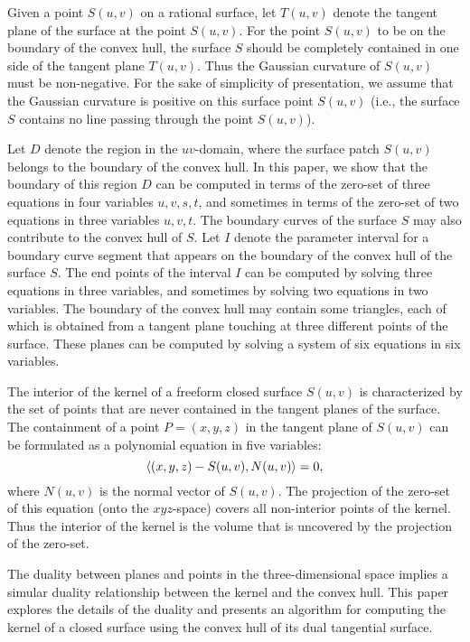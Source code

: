 \documentclass[doublespacing]{elsart}
\begin{document}
Given a point $S(u,v)$ on a rational surface, let $T(u,v)$ denote
the tangent plane of the surface at the point $S(u,v)$.
For the point $S(u,v)$ to be on the boundary of the convex hull,
the surface $S$ should be completely contained in one side of
the tangent plane $T(u,v)$.  Thus the Gaussian curvature of $S(u,v)$ 
must be non-negative.  For the sake of simplicity of presentation,
we assume that the Gaussian curvature is positive
on this surface point $S(u,v)$ (i.e., the surface $S$ contains
no line passing through the point $S(u,v)$).

Let $D$ denote the region in the $uv$-domain, where the surface
patch $S(u,v)$ belongs to the boundary of the convex hull.
In this paper, we show that the boundary of this region $D$
can be computed in terms of the zero-set of three equations in
four variables $u,v,s,t$, and sometimes in terms of the zero-set of
two equations in three variables $u,v,t$.  The boundary curves
of the surface $S$ may also contribute to the convex hull of $S$.
Let $I$ denote the parameter interval for a boundary curve segment
that appears on the boundary of the convex hull of the surface $S$.
The end points of the interval $I$ can be computed
by solving three equations in three variables,
and sometimes by solving two equations in two variables.
The boundary of the convex hull may contain some triangles,
each of which is obtained from a tangent plane touching at three 
different points of the surface.  These planes can be computed
by solving a system of six equations in six variables.

The interior of the kernel of a freeform closed surface $S(u,v)$
is characterized by the set of points that are never contained
in the tangent planes of the surface.  The containment of
a point $P = (x,y,z)$ in the tangent plane of $S(u,v)$ can be
formulated as a polynomial equation in five variables:
\[
\left<{(x,y,z)-S(u,v)}, {N(u,v)} \right> = 0,
\]
where $N(u,v)$ is the normal vector of $S(u,v)$.
The projection of the zero-set of this equation
(onto the $xyz$-space) covers all non-interior points of the kernel.
Thus the interior of the kernel is the volume
that is uncovered by the projection of the zero-set.

The duality between planes and points in the three-dimensional space
implies a simular duality relationship between the kernel and
the convex hull.  This paper explores the details of the duality
and presents an algorithm for computing the kernel of a closed surface
using the convex hull of its dual tangential surface.
\end{document}
